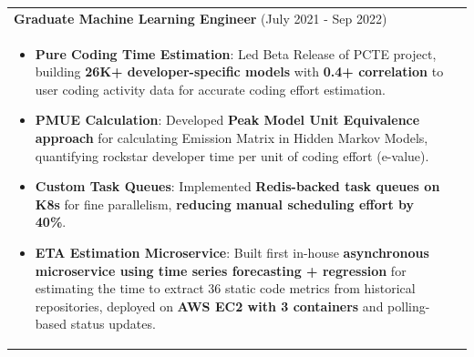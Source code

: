 \documentclass[a4paper,11pt]{article}
\begin{document}
\begin{tabularx}{\linewidth}{ @{}l r@{} }
\textbf{\Large{Graduate Machine Learning Engineer}} (July 2021 - Sep 2022) \\[4pt]
\begin{minipage}[t]{\linewidth}
    \begin{itemize}[nosep,after=\strut, leftmargin=1em, itemsep=4pt]
        \item \textbf{Pure Coding Time Estimation}: Led Beta Release of PCTE project, building \textbf{26K+ developer-specific models} with \textbf{0.4+ correlation} to user coding activity data for accurate coding effort estimation.
        \item \textbf{PMUE Calculation}: Developed \textbf{Peak Model Unit Equivalence approach} for calculating Emission Matrix in Hidden Markov Models, quantifying rockstar developer time per unit of coding effort (e-value).
        \item \textbf{Custom Task Queues}: Implemented \textbf{Redis-backed task queues on K8s} for fine parallelism, \textbf{reducing manual scheduling effort by 40\%}.
        \item \textbf{ETA Estimation Microservice}: Built first in-house \textbf{asynchronous microservice using time series forecasting + regression} for estimating the time to extract 36 static code metrics from historical repositories, deployed on \textbf{AWS EC2 with 3 containers} and polling-based status updates.
    \end{itemize}
\end{minipage}
\end{tabularx}
\end{document}
